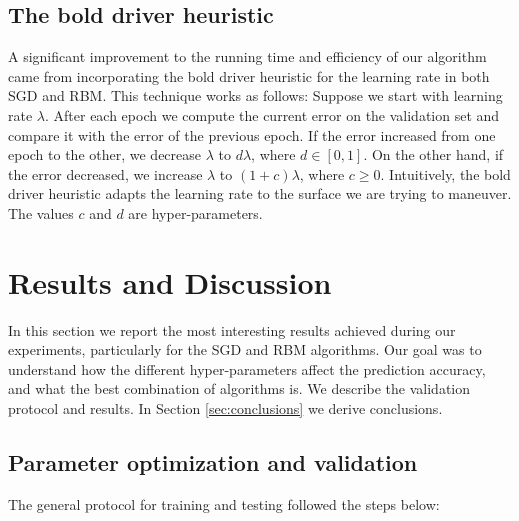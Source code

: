 \documentclass[10pt,conference,compsocconf]{IEEEtran}
\begin{document}
	\subsection{The bold driver heuristic} 
	A significant improvement to the running time and efficiency of our algorithm came from incorporating the bold driver heuristic for the learning rate in both SGD and RBM. This technique works as follows: Suppose we start with learning rate $\lambda$. After each epoch we compute the current error on the validation set and compare it with the error of the previous epoch. If the error increased from one epoch to the other, we decrease $\lambda$ to $d\lambda$, where $d\in[0,1]$. On the other hand, if the error decreased, we increase $\lambda$ to $(1+c)\lambda$, where $c\geq 0$. Intuitively, the bold driver heuristic adapts the learning rate to the surface we are trying to maneuver. The values $c$ and $d$ are hyper-parameters.
	
	\section{Results and Discussion}
	\label{sec:results}
	In this section we report the most interesting results achieved during our experiments, particularly for the SGD and RBM algorithms. Our goal was to understand how the different hyper-parameters affect the prediction accuracy, and what the best combination of algorithms is. We describe the validation protocol and results. In Section \ref{sec:conclusions} we derive conclusions.
	\subsection{Parameter optimization and validation} 
	The general protocol for training and testing followed the steps below:
	
\end{document}
